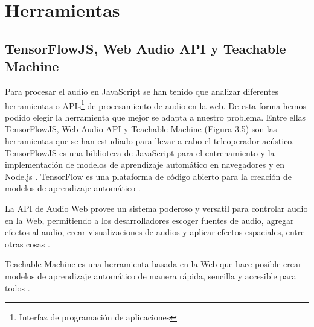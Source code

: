 \section{Herramientas}
\subsection{TensorFlowJS, Web Audio API y Teachable Machine}
Para procesar el audio en JavaScript se han tenido que analizar diferentes herramientas o APIs\footnote{Interfaz de programación de aplicaciones} de procesamiento de audio en la web. De esta forma hemos podido elegir la herramienta que mejor se adapta a nuestro problema.
Entre ellas TensorFlowJS, Web Audio API y Teachable Machine (Figura 3.5) son las herramientas que se han estudiado para llevar a cabo el teleoperador acústico.
\\
TensorFlowJS es una biblioteca de JavaScript para el entrenamiento y la implementación de modelos de aprendizaje automático en navegadores y en Node.js . TensorFlow es una plataforma de código abierto para la creación de modelos de aprendizaje automático \cite{tfjs}.

La API de Audio Web provee un sistema poderoso y versatil para controlar audio en la Web, permitiendo a los desarrolladores escoger fuentes de audio, agregar efectos al audio, crear visualizaciones de audios y aplicar efectos espaciales, entre otras cosas \cite{waa}.

Teachable Machine es una herramienta basada en la Web que hace posible crear modelos de aprendizaje automático de manera rápida, sencilla y accesible para todos \cite{tm}.

